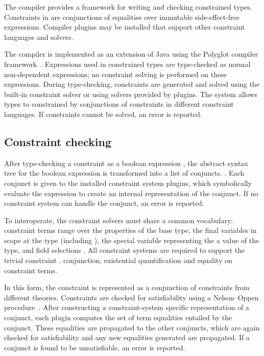 %

The \Xten{} compiler provides a framework for writing and
checking constrained types.  
Constraints in \Xten{} are conjunctions of equalities over immutable
side-effect-free expressions.  Compiler plugins may be installed
that support other constraint languages and solvers.

The \Xten{} compiler is implemented as an extension of
Java using the Polyglot compiler framework~\cite{ncm03}.
Expressions used in constrained
types are type-checked as normal non-dependent \Xten{} expressions;
no constraint solving is performed on these expressions.
During type-checking, constraints are generated and solved using
the built-in constraint solver or using solvers provided by
plugins.  The system allows types to constrained by conjunctions
of constraints in different constraint languages.
If constraints cannot be solved, an error is reported.

\subsection{Constraint checking}

After type-checking a constraint as a boolean expression ,
the abstract syntax tree for
the boolean expression is transformed into a list of conjuncts.
.  Each conjunct  is given to 
the installed constraint system plugins, which symbolically
evaluate the expression to create an internal representation of
the conjunct.  If no
constraint system can handle the conjunct, an error is reported.

To interoperate, the constraint solvers must share a common
vocabulary: constraint terms  range over the properties of the
base type, the final variables in scope at the type (including
), the special variable  representing
the a value of the type, and field selections .
All
constraint systems are required to support the trivial
constraint
, conjunction, existential quantification and equality on
constraint terms.


In this form, the constraint is represented as a 
conjunction of constraints from different theories.  Constraints
are checked for satisfiability using a Nelson--Oppen
procedure~\cite{nelson-oppen}.
After constructing a constraint-system specific 
representation of a conjunct, each plugin computes the set of
term equalities entailed by the conjunct.  These equalities are
propagated to the other conjuncts, which are again checked for
satisfiability and any new equalities generated are propagated.
If a conjunct is found to be unsatisfiable, an error is
reported. 

